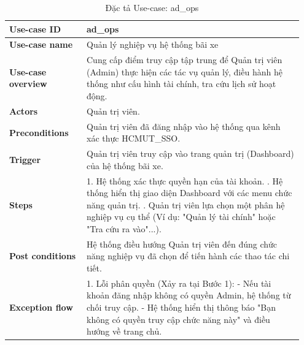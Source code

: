 \begin{table}[htpb]
\centering
\renewcommand{\arraystretch}{1.4}
\begin{tabular}{|p{0.25\linewidth}|p{0.7\linewidth}|}
\hline
\textbf{Use-case ID} & ad\_ops \\ \hline
\textbf{Use-case name} & Quản lý nghiệp vụ hệ thống bãi xe \\ \hline
\textbf{Use-case overview} & Cung cấp điểm truy cập tập trung để Quản trị viên (Admin) thực hiện các tác vụ quản lý, điều hành hệ thống như cấu hình tài chính, tra cứu lịch sử hoạt động. \\ \hline
\textbf{Actors} & Quản trị viên. \\ \hline
\textbf{Preconditions} & Quản trị viên đã đăng nhập vào hệ thống qua kênh xác thực HCMUT\_SSO. \\ \hline
\textbf{Trigger} & Quản trị viên truy cập vào trang quản trị (Dashboard) của hệ thống bãi xe. \\ \hline
\textbf{Steps} & 
1. Hệ thống xác thực quyền hạn của tài khoản. \newline
2. Hệ thống hiển thị giao diện Dashboard với các menu chức năng quản trị. \newline
3. Quản trị viên lựa chọn một phân hệ nghiệp vụ cụ thể (Ví dụ: "Quản lý tài chính" hoặc "Tra cứu ra vào"...). \\ \hline
\textbf{Post conditions} & Hệ thống điều hướng Quản trị viên đến đúng chức năng nghiệp vụ đã chọn để tiến hành các thao tác chi tiết. \\ \hline
\textbf{Exception flow} & 
1. Lỗi phân quyền (Xảy ra tại Bước 1): \newline
- Nếu tài khoản đăng nhập không có quyền Admin, hệ thống từ chối truy cập. \newline
- Hệ thống hiển thị thông báo "Bạn không có quyền truy cập chức năng này" và điều hướng về trang chủ. \\ \hline
\end{tabular}
\caption{Đặc tả Use-case: ad\_ops}
\label{tab:uc_ad_ops}
\end{table}


